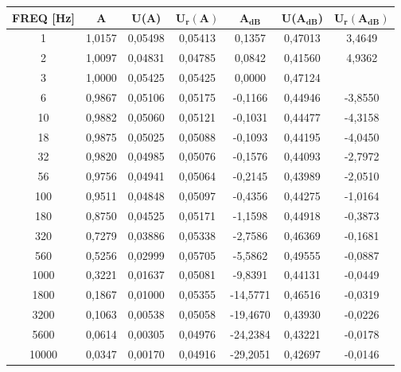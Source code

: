 \begin{table}[!ht]
    \centering
    \begin{tabular}{|c|c|c|c|c|c|c|}
    \hline
        \textbf{FREQ [Hz]} & \textbf{A} & \textbf{U(A)} & $\bm{U_r(A)}$ & $\bm{A_{dB}}$ & \textbf{U($\bm{A_{dB}}$)} & $\bm{U_r(A_{dB})}$ \\ \hline
        1 & 1,0157 & 0,05498 & 0,05413 & 0,1357 & 0,47013 & 3,4649 \\ \hline
        2 & 1,0097 & 0,04831 & 0,04785 & 0,0842 & 0,41560 & 4,9362 \\ \hline
        3 & 1,0000 & 0,05425 & 0,05425 & 0,0000 & 0,47124 & ~ \\ \hline
        6 & 0,9867 & 0,05106 & 0,05175 & -0,1166 & 0,44946 & -3,8550 \\ \hline
        10 & 0,9882 & 0,05060 & 0,05121 & -0,1031 & 0,44477 & -4,3158 \\ \hline
        18 & 0,9875 & 0,05025 & 0,05088 & -0,1093 & 0,44195 & -4,0450 \\ \hline
        32 & 0,9820 & 0,04985 & 0,05076 & -0,1576 & 0,44093 & -2,7972 \\ \hline
        56 & 0,9756 & 0,04941 & 0,05064 & -0,2145 & 0,43989 & -2,0510 \\ \hline
        100 & 0,9511 & 0,04848 & 0,05097 & -0,4356 & 0,44275 & -1,0164 \\ \hline
        180 & 0,8750 & 0,04525 & 0,05171 & -1,1598 & 0,44918 & -0,3873 \\ \hline
        320 & 0,7279 & 0,03886 & 0,05338 & -2,7586 & 0,46369 & -0,1681 \\ \hline
        560 & 0,5256 & 0,02999 & 0,05705 & -5,5862 & 0,49555 & -0,0887 \\ \hline
        1000 & 0,3221 & 0,01637 & 0,05081 & -9,8391 & 0,44131 & -0,0449 \\ \hline
        1800 & 0,1867 & 0,01000 & 0,05355 & -14,5771 & 0,46516 & -0,0319 \\ \hline
        3200 & 0,1063 & 0,00538 & 0,05058 & -19,4670 & 0,43930 & -0,0226 \\ \hline
        5600 & 0,0614 & 0,00305 & 0,04976 & -24,2384 & 0,43221 & -0,0178 \\ \hline
        10000 & 0,0347 & 0,00170 & 0,04916 & -29,2051 & 0,42697 & -0,0146 \\ \hline
    \end{tabular}
\end{table}

\FloatBarrier
\clearpage

